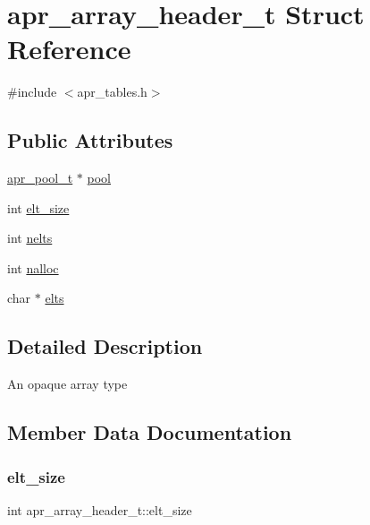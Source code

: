\hypertarget{structapr__array__header__t}{}\section{apr\+\_\+array\+\_\+header\+\_\+t Struct Reference}
\label{structapr__array__header__t}


{\ttfamily \#include $<$apr\+\_\+tables.\+h$>$}

\subsection*{Public Attributes}
\begin{DoxyCompactItemize}
\item 
\mbox{\hyperlink{group__apr__pools_gaf137f28edcf9a086cd6bc36c20d7cdfb}{apr\+\_\+pool\+\_\+t}} $\ast$ \mbox{\hyperlink{structapr__array__header__t_a68f353ce65943172fcc9494aa9f6e424}{pool}}
\item 
int \mbox{\hyperlink{structapr__array__header__t_a36a690ebc781edc9e99ac1bec53c1770}{elt\+\_\+size}}
\item 
int \mbox{\hyperlink{structapr__array__header__t_ab11b88220885c5a0920a06ac85680055}{nelts}}
\item 
int \mbox{\hyperlink{structapr__array__header__t_a0ceb78a23ebef1bceea5f0cd3e1513b6}{nalloc}}
\item 
char $\ast$ \mbox{\hyperlink{structapr__array__header__t_af8462fa2a1ddf6406c66cd3dd441a269}{elts}}
\end{DoxyCompactItemize}


\subsection{Detailed Description}
An opaque array type 

\subsection{Member Data Documentation}
\mbox{\label{structapr__array__header__t_a36a690ebc781edc9e99ac1bec53c1770}} 
\subsubsection{\texorpdfstring{elt\+\_\+size}{elt\_size}}
{\footnotesize\ttfamily int apr\+\_\+array\+\_\+header\+\_\+t\+::elt\+\_\+size}

